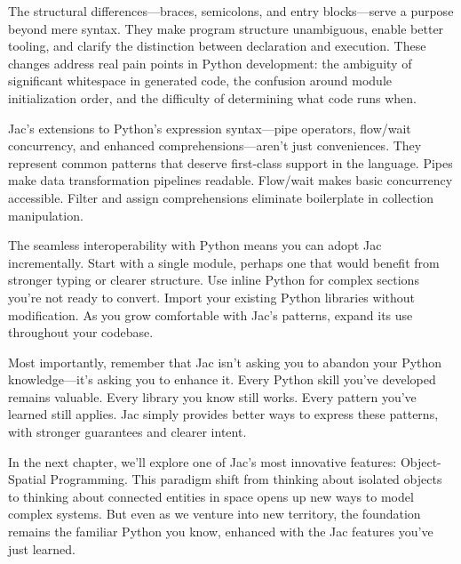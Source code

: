 The structural differences—braces, semicolons, and entry blocks—serve a purpose beyond mere syntax. They make program structure unambiguous, enable better tooling, and clarify the distinction between declaration and execution. These changes address real pain points in Python development: the ambiguity of significant whitespace in generated code, the confusion around module initialization order, and the difficulty of determining what code runs when.

Jac's extensions to Python's expression syntax—pipe operators, flow/wait concurrency, and enhanced comprehensions—aren't just conveniences. They represent common patterns that deserve first-class support in the language. Pipes make data transformation pipelines readable. Flow/wait makes basic concurrency accessible. Filter and assign comprehensions eliminate boilerplate in collection manipulation.

The seamless interoperability with Python means you can adopt Jac incrementally. Start with a single module, perhaps one that would benefit from stronger typing or clearer structure. Use inline Python for complex sections you're not ready to convert. Import your existing Python libraries without modification. As you grow comfortable with Jac's patterns, expand its use throughout your codebase.

Most importantly, remember that Jac isn't asking you to abandon your Python knowledge—it's asking you to enhance it. Every Python skill you've developed remains valuable. Every library you know still works. Every pattern you've learned still applies. Jac simply provides better ways to express these patterns, with stronger guarantees and clearer intent.

In the next chapter, we'll explore one of Jac's most innovative features: Object-Spatial Programming. This paradigm shift from thinking about isolated objects to thinking about connected entities in space opens up new ways to model complex systems. But even as we venture into new territory, the foundation remains the familiar Python you know, enhanced with the Jac features you've just learned.


